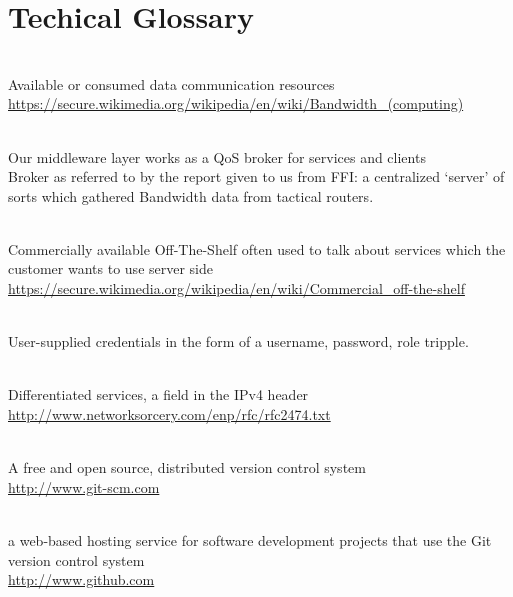 \section{Techical Glossary}
\begin{description}\label{glossary}

\item[Bandwidth]\label{glossary:bandwidth} \hfill\\
Available or consumed data communication resources \\ \url{https://secure.wikimedia.org/wikipedia/en/wiki/Bandwidth_(computing)}

\item[Broker]\label{glossary:broker} \hfill\\
Our middleware layer works as a QoS broker for services and clients \\
Broker as referred to by the report given to us from FFI: a centralized ‘server’ of sorts which gathered Bandwidth data from tactical routers.

\item[COTS]\label{glossary:cots} \hfill\\
Commercially available Off-The-Shelf often used to talk about services which the customer wants to use server side \\ \url{https://secure.wikimedia.org/wikipedia/en/wiki/Commercial_off-the-shelf}

\item[Credentials]\label{glossary:credentials} \hfill\\
User-supplied credentials in the form of a username, password, role tripple.

\item[DiffServ]\label{glossary:diffserv} \hfill\\
Differentiated services, a field in the IPv4 header \\ \url{http://www.networksorcery.com/enp/rfc/rfc2474.txt}

\item[Git]\label{glossary:git} \hfill\\
A free and open source, distributed version control system \\ \url{http://www.git-scm.com}

\item[Github]\label{glossary:github} \hfill\\
a web-based hosting service for software development projects that use the Git version control system \\ \url{http://www.github.com}


\end{description}
